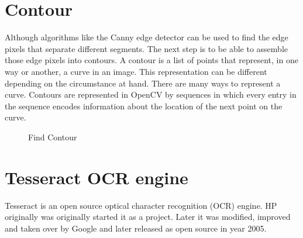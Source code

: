 \section{Contour}
Although algorithms like the Canny edge detector can be used to find the edge pixels that separate different segments. The next step is to be able to assemble those edge pixels into contours.
A contour is a list of points that represent, in one way or another, a curve in an image. This representation can be different depending on the circumstance at hand. There are many ways to represent a curve. Contours are represented in OpenCV by sequences in which every entry in the sequence encodes information about the location of the next point on the curve.

\begin{figure}[H]
\centering
{}
\caption {Find Contour}
\label {fig:ContourDetection}
\end{figure}

\section{Tesseract OCR engine}
Tesseract is an open source optical character recognition (OCR) engine. HP originally was originally started it as a project. Later it was modified, improved and taken over by Google and later released as open source in year 2005.

